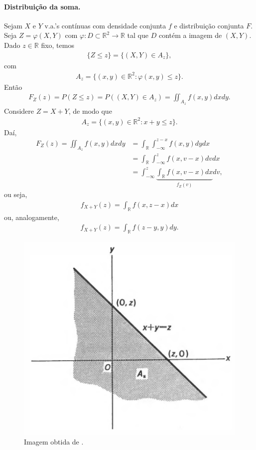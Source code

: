 \documentclass[../Notas.tex]{subfiles}
\begin{document}
\paragraph{Distribuição da soma.} Sejam $X$ e $Y$ v.a.'s contínuas com densidade conjunta $f$ e distribuição conjunta $F$. Seja $Z = \varphi(X,Y)$ com $\varphi:D\subset\mathbb{R}^2\to\mathbb{R}$ tal que $D$ contém a imagem de $(X,Y)$. Dado $z\in\mathbb{R}$ fixo, temos
\begin{align*}
    \{ Z\leq z \} = \{ (X,Y)\in A_z \},
\end{align*}
com
\begin{align*}
    A_z = \{ (x,y)\in\mathbb{R}^2 : \varphi(x,y)\leq z \}.
\end{align*}
Então
\begin{align*}
    F_Z(z) = P(Z\leq z) = P((X,Y)\in A_z) = \iint_{A_z} f(x,y) dxdy.
\end{align*}
Considere $Z = X+Y$, de modo que
\begin{align*}
    A_z = \{ (x,y)\in\mathbb{R}^2 : x+y\leq z \}.
\end{align*}
Daí, 
\begin{align*}
    F_Z(z) = \iint_{A_z} f(x,y) dxdy &= \int_{\mathbb{R}}\int_{-\infty}^{z-x} f(x,y) dydx \\
    &= \int_{\mathbb{R}}\int_{-\infty}^z f(x, v-x) dvdx \\
    &= \int_{-\infty}^z\underbrace{\int_{\mathbb{R}} f(x,v-x) dx}_{f_Z(v)}dv,
\end{align*}
ou seja,
\begin{align*}
    f_{X+Y}(z) = \int_{\mathbb{R}} f(x, z-x) dx
\end{align*}
ou, analogamente,
\begin{align*}
    f_{X+Y}(z) = \int_{\mathbb{R}} f(z-y, y) dy.
\end{align*}
\begin{figure}[H]
    \centering
    \includegraphics[width=\textwidth]{Imagens/soma.png}
    \caption{Imagem obtida de \cite{Hoel}.}
\end{figure}
\end{document}
